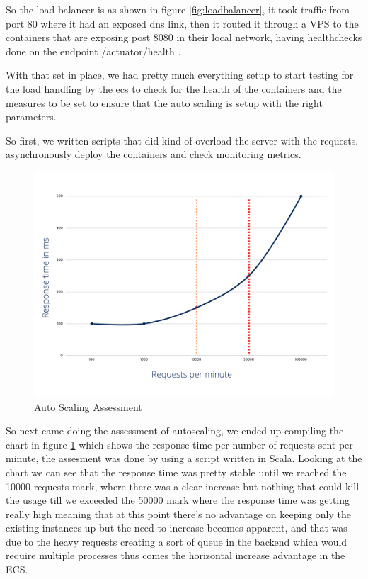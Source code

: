 So the load balancer is as shown in figure \ref{fig:loadbalancer}, it took traffic from
port 80 where it had an exposed dns link, then it routed it through a VPS to the
containers that are exposing post 8080 in their local network, having healthchecks
done on the endpoint /actuator/health .

With that set in place, we had pretty much everything setup to start testing for the
load handling by the ecs to check for the health of the containers and the measures
to be set to ensure that the auto scaling is setup with the right parameters.

So first, we written scripts that did kind of overload the server with the requests,
asynchronously deploy the containers and check monitoring metrics.

\begin{figure}[!ht]
    \centering
    \includegraphics[width=\textwidth]{images/assesment_autoscaling.png}
    \caption{\footnotesize{Auto Scaling Assessment}}
    \label{fig:autoscaling_assessment}
\end{figure}

So next came doing the assessment of autoscaling, we ended up compiling the chart
in figure \ref{fig:autoscaling_assessment} which shows the response time per
number of requests sent per minute, the assesment was done by using a script
written in Scala.
Looking at the chart we can see that the response time was pretty stable until
we reached the 10000 requests mark, where there was a clear increase but nothing
that could kill the usage till we exceeded the 50000 mark where the response time
was getting really high meaning that at this point there's no advantage on keeping
only the existing instances up but the need to increase becomes apparent, and that
was due to the heavy requests creating a sort of queue in the backend which would
require multiple processes thus comes the horizontal increase advantage in the ECS.


